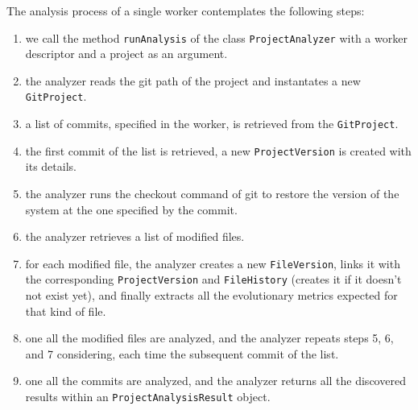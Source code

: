 The analysis process of a single worker contemplates the following steps:
\begin{enumerate}
    \item we call the method \texttt{runAnalysis} of the class \texttt{ProjectAnalyzer} with a worker descriptor and a project as an argument. 
    \item the analyzer reads the git path of the project and instantates a new \texttt{GitProject}. 
    \item a list of commits, specified in the worker, is retrieved from the \texttt{GitProject}.
    \item the first commit of the list is retrieved, a new \texttt{ProjectVersion} is created with its details. 
    \item the analyzer runs the checkout command of git to restore the version of the system at the one specified by the commit. 
    \item the analyzer retrieves a list of modified files. 
    \item for each modified file, the analyzer creates a new \texttt{FileVersion}, links it with the corresponding  \texttt{ProjectVersion} and \texttt{FileHistory} (creates it if it doesn't not exist yet), and finally extracts all the evolutionary metrics expected for that kind of file.
    \item one all the modified files are analyzed, and the analyzer repeats steps 5, 6, and 7 considering, each time the subsequent commit of the list. 
    \item one all the commits are analyzed, and the analyzer returns all the discovered results within an \texttt{ProjectAnalysisResult} object. 
\end{enumerate}

